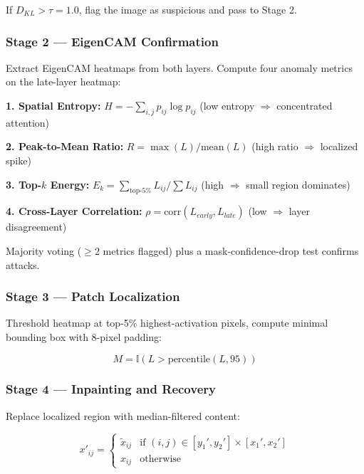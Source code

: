 \documentclass[conference]{IEEEtran}
\begin{document}
If $D_{KL} > \tau = 1.0$, flag the image as suspicious and pass to Stage 2.

\subsubsection{Stage 2 --- EigenCAM Confirmation}

Extract EigenCAM heatmaps from both layers. Compute four anomaly metrics on the late-layer heatmap:

\textbf{1. Spatial Entropy:} $H = -\sum_{i,j} p_{ij} \log p_{ij}$ (low entropy $\Rightarrow$ concentrated attention)

\textbf{2. Peak-to-Mean Ratio:} $R = \max(L)/\text{mean}(L)$ (high ratio $\Rightarrow$ localized spike)

\textbf{3. Top-$k$ Energy:} $E_k = \sum_{\text{top-5\%}} L_{ij} / \sum L_{ij}$ (high $\Rightarrow$ small region dominates)

\textbf{4. Cross-Layer Correlation:} $\rho = \text{corr}(L_{early}, L_{late})$ (low $\Rightarrow$ layer disagreement)

Majority voting ($\geq 2$ metrics flagged) plus a mask-confidence-drop test confirms attacks.

\subsubsection{Stage 3 --- Patch Localization}

Threshold heatmap at top-5\% highest-activation pixels, compute minimal bounding box with 8-pixel padding:

\begin{equation}
M = \mathbb{I}(L > \text{percentile}(L, 95))
\end{equation}

\subsubsection{Stage 4 --- Inpainting and Recovery}

Replace localized region with median-filtered content:

\begin{equation}
x'_{ij} = \begin{cases}
\tilde{x}_{ij} & \text{if } (i,j) \in [y_1', y_2'] \times [x_1', x_2'] \\
x_{ij} & \text{otherwise}
\end{cases}
\end{equation}
\end{document}
